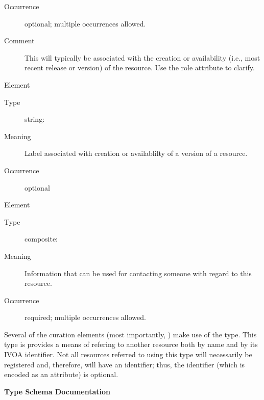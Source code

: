 \documentclass[11pt,a4paper]{ivoa}
\begin{document}
\begin{bigdescription}
\begin{description}
\item[Occurrence] optional; multiple occurrences allowed.
\item[Comment] 
               This will typically be associated with the creation or 
               availability (i.e., most recent release or version) of
               the resource.  Use the role attribute to clarify.
             

\end{description}
\item[Element \xmlel{version}]
\begin{description}
\item[Type] string: 
\item[Meaning] 
               Label associated with creation or availablilty of a version of 
               a resource.
             
\item[Occurrence] optional

\end{description}
\item[Element \xmlel{contact}]
\begin{description}
\item[Type] composite: 
\item[Meaning] 
               Information that can be used for contacting someone with
               regard to this resource.
             
\item[Occurrence] required; multiple occurrences allowed.

\end{description}


\end{bigdescription}\endgroup

\endgroup

Several of the curation elements (most importantly,
\/) make use of the
 type.  This type is provides a means of
refering to another resource both by name and by its IVOA
identifier.  Not all resources referred to using this type will
necessarily be registered and, therefore, will have an identifier;
thus, the identifier (which is encoded as an attribute) is optional. 


\begingroup
      	\renewcommand*\descriptionlabel[1]{%
      	\hbox to 5.5em{\emph{#1}\hfil}}\vspace{2ex}\noindent\textbf{ Type Schema Documentation}
\end{document}
